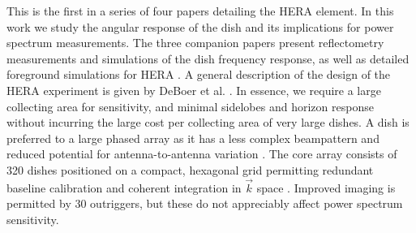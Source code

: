 \documentclass{emulateapj}
\begin{document}


This is the first in a series of four papers detailing the HERA element. In this work we study 
the angular response of the dish and its implications for power spectrum measurements. The three companion 
papers present reflectometry measurements \citep{patra16} and simulations \citep{ewallwice16} of the dish frequency response, as well as detailed 
foreground simulations for HERA \citep{nithya16}. A general description of the design of the 
HERA experiment is given by DeBoer et al. \citep{deboer16}. In essence, we 
require a large collecting area for
 sensitivity, and minimal sidelobes and horizon response without incurring the large cost per collecting 
area of very large dishes. A dish is preferred to a large phased array as it has a less complex beampattern and reduced potential for antenna-to-antenna variation \citep{neben16}. The core array consists of 320 dishes positioned on a compact, hexagonal 
grid \citep{dillonparsons16} permitting redundant baseline calibration and coherent integration in $
\vec{k}$ space \citep{zheng14,parsons12a}. Improved imaging is permitted by 30 outriggers, but these do not appreciably affect power spectrum sensitivity.
\end{document}
